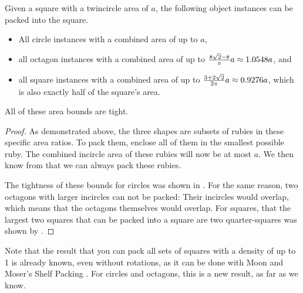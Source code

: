 \documentclass[a4paper,style=print,oneside,bibliography=totoc,nexus,lnum,extramargin]{tubsbook}
\begin{document}
\begin{corollary}\label{th:square2}
    Given a square with a twincircle area of $a$, the following object instances can be packed into the square.

    \begin{itemize}
        \item All circle instances with a combined area of up to $a$,
        \item all octagon instances with a combined area of up to $\frac{8\sqrt{2}-8}{\pi}a \approx 1.0548a$, and
        \item all square instances with a combined area of up to $\frac{3+2\sqrt{2}}{2\pi}a \approx 0.9276a$, which is also exactly half of the square's area.
    \end{itemize}

    All of these area bounds are tight.
\end{corollary}

\begin{proof}
    As demonstrated above, the three shapes are subsets of rubies in these specific area ratios. To pack them, enclose all of them in the smallest possible ruby. The combined incircle area of these rubies will now be at most $a$. We then know from  that we can always pack these rubies.

    The tightness of these bounds for circles was shown in . For the same reason, two octagons with larger incircles can not be packed: Their incircles would overlap, which means that the octagons themselves would overlap. For squares, that the largest two squares that can be packed into a square are two quarter-squares was shown by \textcite{gobel1979geometrical}.
\end{proof}

Note that the result that you can pack all sets of squares with a density of up to 1 is already known, even without rotations, as it can be done with Moon and Moser's Shelf Packing \cite{MM1967some}. For circles and octagons, this is a new result, as far as we know.

%
%
%
\end{document}
